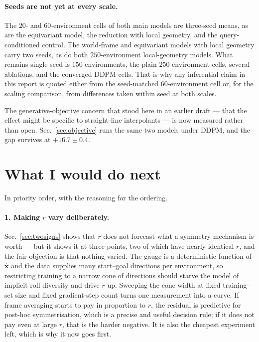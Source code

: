 \documentclass[11pt,a4paper]{article}
\newcommand{\xhat}{\hat{\mathbf{x}}}
\begin{document}
\paragraph{Seeds are not yet at every scale.} The $20$- and $60$-environment
cells of both main models are three-seed means, as are the equivariant model, the
reduction with local geometry, and the query-conditioned control. The
world-frame and equivariant models with local geometry carry two seeds, as do both
$250$-environment local-geometry models. What remains single seed is $150$
environments, the plain $250$-environment cells, several ablations, and the
converged DDPM cells. That is why any inferential claim in this report is quoted
either from the seed-matched $60$-environment cell or, for the scaling
comparison, from differences taken within seed at both scales.

The generative-objective concern that stood here in an earlier draft --- that the
effect might be specific to straight-line interpolants --- is now measured rather
than open. Sec.~\ref{sec:objective} runs the same two models under DDPM, and the
gap survives at $+16.7 \pm 0.4$.

\section{What I would do next}
\label{sec:future}

In priority order, with the reasoning for the ordering.

\paragraph{1. Making $r$ vary deliberately.} Sec.~\ref{sec:twosigns} shows that
$r$ does not forecast what a symmetry mechanism is worth --- but it shows it at
three points, two of which have nearly identical $r$, and the fair objection is
that nothing varied. The gauge is a deterministic function of $\xhat$ and the
data supplies many start--goal directions per environment, so restricting
training to a narrow cone of directions should starve the model of implicit roll
diversity and drive $r$ up. Sweeping the cone width at fixed training-set size
and fixed gradient-step count turns one measurement into a curve. If frame
averaging starts to pay in proportion to $r$, the residual is predictive for
post-hoc symmetrisation, which is a precise and useful decision rule; if it does
not pay even at large $r$, that is the harder negative. It is also the cheapest
experiment left, which is why it now goes first.
\end{document}
